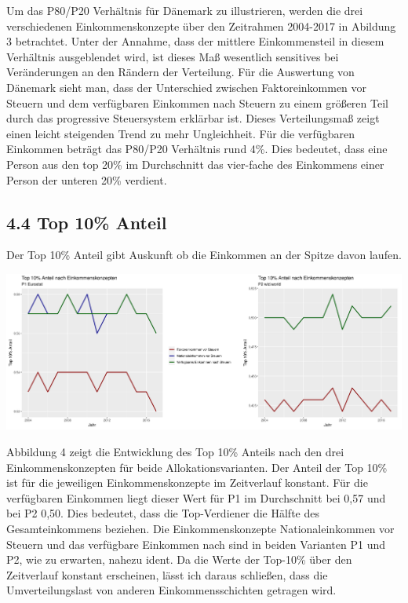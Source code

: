 \documentclass[ngerman,]{article}
\let\origfigure\figure
\let\endorigfigure\endfigure
\renewenvironment{figure}[1][2] {
        \expandafter\origfigure\expandafter[H]
      } {\endorigfigure}
\begin{document}
Um das P80/P20 Verhältnis für Dänemark zu illustrieren, werden die drei
verschiedenen Einkommenskonzepte über den Zeitrahmen 2004-2017 in
Abildung 3 betrachtet. Unter der Annahme, dass der mittlere
Einkommensteil in diesem Verhältnis ausgeblendet wird, ist dieses Maß
wesentlich sensitives bei Veränderungen an den Rändern der Verteilung.
Für die Auswertung von Dänemark sieht man, dass der Unterschied zwischen
Faktoreinkommen vor Steuern und dem verfügbaren Einkommen nach Steuern
zu einem größeren Teil durch das progressive Steuersystem erklärbar ist.
Dieses Verteilungsmaß zeigt einen leicht steigenden Trend zu mehr
Ungleichheit. Für die verfügbaren Einkommen beträgt das P80/P20
Verhältnis rund 4\%. Dies bedeutet, dass eine Person aus den top 20\% im
Durchschnitt das vier-fache des Einkommens einer Person der unteren 20\%
verdient.

\subsection{4.4 Top 10\% Anteil}\label{top-10-anteil}

Der Top 10\% Anteil gibt Auskunft ob die Einkommen an der Spitze davon
laufen.

\begin{figure}
\centering
\includegraphics[width=1.00000\textwidth]{img/toptenfull.png}
\caption{Top 10\% Anteil nach P1 und P2, 2004-2017}
\end{figure}

Abbildung 4 zeigt die Entwicklung des Top 10\% Anteils nach den drei
Einkommenskonzepten für beide Allokationsvarianten. Der Anteil der Top
10\% ist für die jeweiligen Einkommenskonzepte im Zeitverlauf konstant.
Für die verfügbaren Einkommen liegt dieser Wert für P1 im Durchschnitt
bei 0,57 und bei P2 0,50. Dies bedeutet, dass die Top-Verdiener die
Hälfte des Gesamteinkommens beziehen. Die Einkommenskonzepte
Nationaleinkommen vor Steuern und das verfügbare Einkommen nach sind in
beiden Varianten P1 und P2, wie zu erwarten, nahezu ident. Da die Werte
der Top-10\% über den Zeitverlauf konstant erscheinen, lässt ich daraus
schließen, dass die Umverteilungslast von anderen Einkommensschichten
getragen wird.
\end{document}
